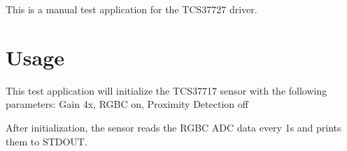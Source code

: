 This is a manual test application for the T\+C\+S37727 driver.

\section*{Usage}

This test application will initialize the T\+C\+S37717 sensor with the following parameters\+: Gain 4x, R\+G\+BC on, Proximity Detection off

After initialization, the sensor reads the R\+G\+BC A\+DC data every 1s and prints them to S\+T\+D\+O\+UT. 
